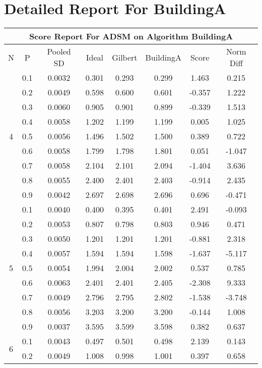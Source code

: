 \documentclass[11pt,a4paper]{report}
\begin{document}
\chapter{Detailed Report For BuildingA}
\begin{longtable}{ | c | c || c | c | c | c | c | c | }
\hline
\multicolumn{8}{|c|}{ Score Report For ADSM on Algorithm BuildingA} \\
\hline
N & P & Pooled SD &  Ideal &  Gilbert & BuildingA  & Score & Norm Diff \\
 \hline
 \hline
 \endhead
\multirow{9}{*}{4} & 0.1 & 0.0032 & 0.301 & 0.293 & 0.299 & 1.463 & 0.215 \\
 & 0.2 & 0.0049 & 0.598 & 0.600 & 0.601 & -0.357 & 1.222 \\
 & 0.3 & 0.0060 & 0.905 & 0.901 & 0.899 & -0.339 & 1.513 \\
 & 0.4 & 0.0058 & 1.202 & 1.199 & 1.199 & 0.005 & 1.025 \\
 & 0.5 & 0.0056 & 1.496 & 1.502 & 1.500 & 0.389 & 0.722 \\
 & 0.6 & 0.0058 & 1.799 & 1.798 & 1.801 & 0.051 & -1.047 \\
 & 0.7 & 0.0058 & 2.104 & 2.101 & 2.094 & -1.404 & 3.636 \\
 & 0.8 & 0.0055 & 2.400 & 2.401 & 2.403 & -0.914 & 2.435 \\
 & 0.9 & 0.0042 & 2.697 & 2.698 & 2.696 & 0.696 & -0.471 \\
 \hline
\multirow{9}{*}{5} & 0.1 & 0.0040 & 0.400 & 0.395 & 0.401 & 2.491 & -0.093 \\
 & 0.2 & 0.0053 & 0.807 & 0.798 & 0.803 & 0.946 & 0.471 \\
 & 0.3 & 0.0050 & 1.201 & 1.201 & 1.201 & -0.881 & 2.318 \\
 & 0.4 & 0.0057 & 1.594 & 1.594 & 1.598 & -1.637 & -5.117 \\
 & 0.5 & 0.0054 & 1.994 & 2.004 & 2.002 & 0.537 & 0.785 \\
 & 0.6 & 0.0063 & 2.401 & 2.401 & 2.405 & -2.308 & 9.333 \\
 & 0.7 & 0.0049 & 2.796 & 2.795 & 2.802 & -1.538 & -3.748 \\
 & 0.8 & 0.0056 & 3.203 & 3.200 & 3.200 & -0.144 & 1.008 \\
 & 0.9 & 0.0037 & 3.595 & 3.599 & 3.598 & 0.382 & 0.637 \\
 \hline
\multirow{9}{*}{6} & 0.1 & 0.0043 & 0.497 & 0.501 & 0.498 & 2.139 & 0.143 \\
 & 0.2 & 0.0049 & 1.008 & 0.998 & 1.001 & 0.397 & 0.658 \\

\end{longtable}
\end{document}
